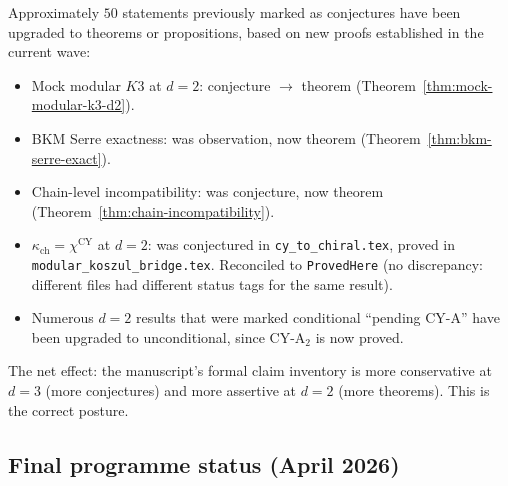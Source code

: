 \documentclass[11pt]{article}
\newcommand{\CY}{\mathrm{CY}}
\begin{document}
Approximately $50$ statements previously marked as conjectures have
been upgraded to theorems or propositions, based on new proofs
established in the current wave:
\begin{itemize}
 \item Mock modular $K3$ at $d = 2$: conjecture $\to$ theorem
 (Theorem~\ref{thm:mock-modular-k3-d2}).
 \item BKM Serre exactness: was observation, now theorem
 (Theorem~\ref{thm:bkm-serre-exact}).
 \item Chain-level incompatibility: was conjecture, now theorem
 (Theorem~\ref{thm:chain-incompatibility}).
 \item $\kappa_{\mathrm{ch}} = \chi^{\CY}$ at $d = 2$: was
 conjectured in \texttt{cy\_to\_chiral.tex}, proved in
 \texttt{modular\_koszul\_bridge.tex}. Reconciled to
 \texttt{ProvedHere} (no discrepancy: different files had different
 status tags for the same result).
 \item Numerous $d = 2$ results that were marked conditional
 ``pending CY-A'' have been upgraded to unconditional, since
 CY-A$_2$ is now proved.
\end{itemize}

\noindent The net effect: the manuscript's formal claim inventory
is more conservative at $d = 3$ (more conjectures) and more
assertive at $d = 2$ (more theorems). This is the correct posture.


\subsection{Final programme status (April 2026)}
\label{subsec:final-programme-status-v2}
\end{document}
